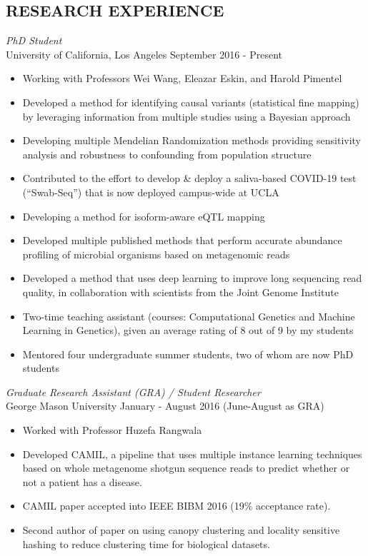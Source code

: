 \documentclass[margin, 10pt]{res} %
\begin{document}
\begin{resume}
\section{RESEARCH EXPERIENCE}

{\sl PhD Student} \\
University of California, Los Angeles \hfill September 2016 - Present
\begin{itemize} \itemsep -2pt %
\item Working with Professors Wei Wang, Eleazar Eskin, and Harold Pimentel
\item Developed a method for identifying causal variants (statistical fine mapping) by leveraging information from multiple studies using a Bayesian approach 
\item Developing multiple Mendelian Randomization methods providing sensitivity analysis and robustness to confounding from population structure
\item Contributed to the effort to develop \& deploy a saliva-based COVID-19 test (``Swab-Seq'') that is now deployed campus-wide at UCLA
\item Developing a method for isoform-aware eQTL mapping
\item Developed multiple published methods that perform accurate abundance profiling of microbial organisms based on metagenomic reads
\item Developed a method that uses deep learning to improve long sequencing read quality, in collaboration with scientists from the Joint Genome Institute
\item Two-time teaching assistant (courses: Computational Genetics and Machine Learning in Genetics), given an average rating of 8 out of 9 by my students
\item Mentored four undergraduate summer students, two of whom are now PhD students
\end{itemize}

{\sl Graduate Research Assistant (GRA) / Student Researcher} \\
George Mason University \hfill January - August 2016 (June-August as GRA)
\begin{itemize} \itemsep -2pt %
\item Worked with Professor Huzefa Rangwala 
\item Developed CAMIL, a pipeline that uses multiple instance learning techniques based on whole metagenome shotgun sequence reads to predict whether or not a patient has a disease.
\item CAMIL paper accepted into IEEE BIBM 2016 (19\% acceptance rate).
\item Second author of paper on using canopy clustering and locality sensitive hashing to reduce clustering time for biological datasets.
\end{itemize}


\end{resume}
\end{document}
